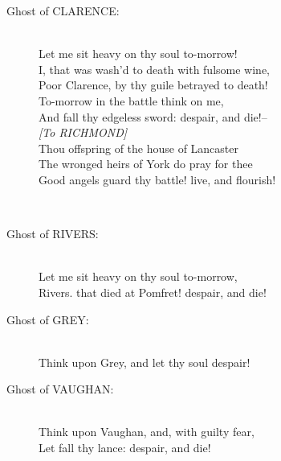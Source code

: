 \documentclass{article}
\begin{document}
\begin{description}
\item[Ghost of CLARENCE:] 
\hspace{1pt}\\
\hspace{1pt}Let me sit heavy on thy soul to-morrow!\\
\hspace{1pt}I, that was wash'd to death with fulsome wine,\\
\hspace{1pt}Poor Clarence, by thy guile betrayed to death!\\
\hspace{1pt}To-morrow in the battle think on me,\\
\hspace{1pt}And fall thy edgeless sword: despair, and die!--\\
{\it [To RICHMOND]}\\
\hspace{1pt}Thou offspring of the house of Lancaster\\
\hspace{1pt}The wronged heirs of York do pray for thee\\
\hspace{1pt}Good angels guard thy battle! live, and flourish!\\
\end{description}
\\
\begin{description}
\item[Ghost of RIVERS:] 
\hspace{1pt}\\
\hspace{1pt}Let me sit heavy on thy soul to-morrow,\\
\hspace{1pt}Rivers. that died at Pomfret! despair, and die!\\
\end{description}
\begin{description}
\item[Ghost of GREY:] 
\hspace{1pt}\\
\hspace{1pt}Think upon Grey, and let thy soul despair!\\
\end{description}
\begin{description}
\item[Ghost of VAUGHAN:] 
\hspace{1pt}\\
\hspace{1pt}Think upon Vaughan, and, with guilty fear,\\
\hspace{1pt}Let fall thy lance: despair, and die!\\
\end{description}
\end{document}
